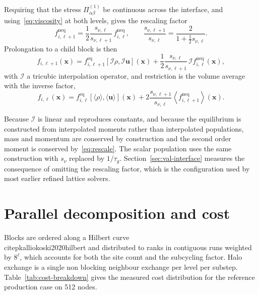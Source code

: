 Requiring that the stress $\Pi_{\alpha\beta}^{(1)}$ be continuous across the
interface, and using~\eqref{eq:viscosity} at both levels, gives the rescaling
factor
\begin{equation}
  f_{i,\ell+1}^{\mathrm{neq}} = \frac{1}{2}
    \frac{s_{\nu,\ell}}{s_{\nu,\ell+1}} \, f_{i,\ell}^{\mathrm{neq}},
  \qquad
  \frac{s_{\nu,\ell+1}}{s_{\nu,\ell}}
    = \frac{2}{1 + \tfrac{1}{2} s_{\nu,\ell}}.
  \label{eq:rescale}
\end{equation}
Prolongation to a child block is then
\begin{equation}
  f_{i,\ell+1}(\mathbf{x}) = f_{i,\ell+1}^{\mathrm{eq}}\!\left[ \mathcal{I}\rho, \mathcal{I}\mathbf{u} \right](\mathbf{x})
    + \frac{1}{2}\frac{s_{\nu,\ell}}{s_{\nu,\ell+1}} \, \mathcal{I} f_{i,\ell}^{\mathrm{neq}}(\mathbf{x}),
  \label{eq:prolong}
\end{equation}
with $\mathcal{I}$ a tricubic interpolation operator, and restriction is the
volume average with the inverse factor,
\begin{equation}
  f_{i,\ell}(\mathbf{x}) = f_{i,\ell}^{\mathrm{eq}}\!\left[ \langle \rho \rangle, \langle \mathbf{u} \rangle \right](\mathbf{x})
    + 2 \frac{s_{\nu,\ell+1}}{s_{\nu,\ell}} \left\langle f_{i,\ell+1}^{\mathrm{neq}} \right\rangle (\mathbf{x}).
  \label{eq:restrict}
\end{equation}

Because $\mathcal{I}$ is linear and reproduces constants, and because the
equilibrium is constructed from interpolated moments rather than interpolated
populations, mass and momentum are conserved by construction and the second
order moment is conserved by~\eqref{eq:rescale}. The scalar population uses the
same construction with $s_\nu$ replaced by $1/\tau_g$. Section~\ref{sec:val-interface}
measures the consequence of omitting the rescaling factor, which is the
configuration used by most earlier refined lattice solvers.

\section{Parallel decomposition and cost}
\label{sec:method-parallel}

Blocks are ordered along a Hilbert curve \\citep{kalliokoski2020hilbert} and
distributed to ranks in contiguous runs weighted by $8^{\ell}$, which accounts for both the site count and the
subcycling factor. Halo exchange is a single non blocking neighbour exchange per
level per substep. Table~\ref{tab:cost-breakdown} gives the measured cost
distribution for the reference production case on 512 nodes.

